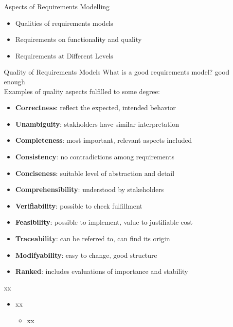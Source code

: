 \documentclass{beamer}
\begin{document}
\begin{frame}[fragile]{Aspects of Requirements Modelling}
\begin{itemize}
\item Qualities of requirements models
\item Requirements on functionality and quality
\item Requirements at Different Levels
\end{itemize}
\end{frame}

\begin{frame}[fragile]{Quality of Requirements Models}
What is a good requirements model? good enough
\\ \vspace*{1em}Examples of quality aspects fulfilled to some degree:
\begin{itemize}
\item \textbf{Correctness}: reflect the expected, intended behavior
\item \textbf{Unambiguity}: stakholders have similar interpretation
\item \textbf{Completeness}: most important, relevant aspects included
\item \textbf{Consistency}: no contradictions among requirements
\item \textbf{Conciseness}: suitable level of abstraction and detail 
\item \textbf{Comprehensibility}: understood by stakeholders 
\item \textbf{Verifiability}: possible to check fulfillment 
\item \textbf{Feasibility}: possible to implement, value to justifiable cost 
\item \textbf{Traceability}: can be referred to, can find its origin
\item \textbf{Modifyability}: easy to change, good structure
\item \textbf{Ranked}: includes evaluations of importance and stability
\end{itemize}
\end{frame}

\begin{frame}[fragile]{xx}
\begin{itemize}
\item xx 
\begin{itemize}
\item xx 
\end{itemize}
\end{itemize}
\end{frame}
\end{document}
